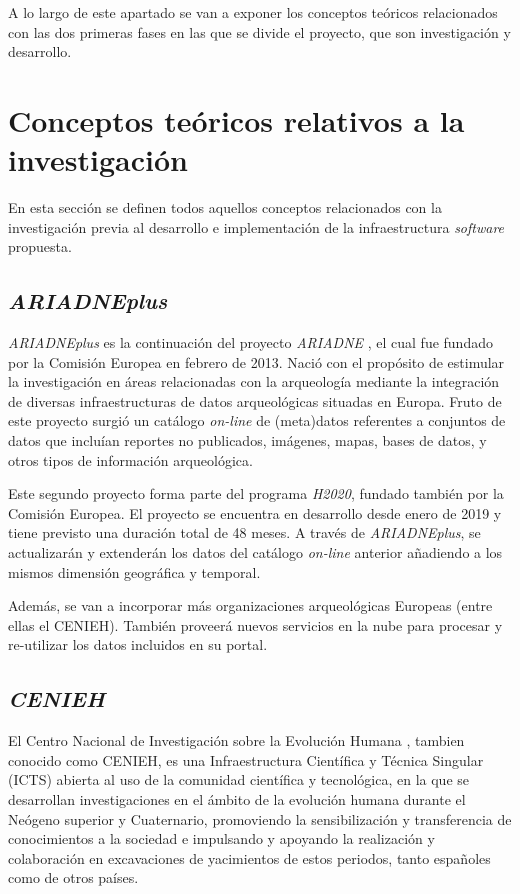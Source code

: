 
A lo largo de este apartado se van a exponer los conceptos teóricos
relacionados con las dos primeras fases en las que se divide el
proyecto, que son investigación y desarrollo.

\section{Conceptos teóricos relativos a la investigación}

En esta sección se definen todos aquellos conceptos relacionados con la
investigación previa al desarrollo e implementación de la
infraestructura \emph{software} propuesta.

\subsection{\emph{ARIADNEplus}}

\emph{ARIADNEplus} \cite{weboff:arip} es la continuación del
proyecto \emph{ARIADNE} \cite{weboff:ari}, el cual fue fundado
por la Comisión Europea en febrero de 2013. Nació con el propósito de
estimular la investigación en áreas relacionadas con la arqueología
mediante la integración de diversas infraestructuras de datos
arqueológicas situadas en Europa. Fruto de este proyecto surgió un
catálogo \emph{on-line} de (meta)datos referentes a conjuntos de datos
que incluían reportes no publicados, imágenes, mapas, bases de datos, y
otros tipos de información arqueológica.

Este segundo proyecto forma parte del programa \emph{H2020}, fundado
también por la Comisión Europea. El proyecto se encuentra en desarrollo
desde enero de 2019 y tiene previsto una duración total de 48 meses. A
través de \emph{ARIADNEplus}, se actualizarán y extenderán los datos del
catálogo \emph{on-line} anterior añadiendo a los mismos dimensión
geográfica y temporal. 

Además, se van a incorporar más organizaciones
arqueológicas Europeas (entre ellas el CENIEH). También proveerá nuevos
servicios en la nube para procesar y re-utilizar los datos incluidos en
su portal.

\subsection{\emph{CENIEH}}

El Centro Nacional de Investigación sobre la Evolución
Humana \cite{weboff:cenieh}, tambien conocido como
CENIEH, es una Infraestructura Científica y Técnica Singular (ICTS)
abierta al uso de la comunidad científica y tecnológica, en la que se
desarrollan investigaciones en el ámbito de la evolución humana durante
el Neógeno superior y Cuaternario, promoviendo la sensibilización y
transferencia de conocimientos a la sociedad e impulsando y apoyando la
realización y colaboración en excavaciones de yacimientos de estos
periodos, tanto españoles como de otros países.

